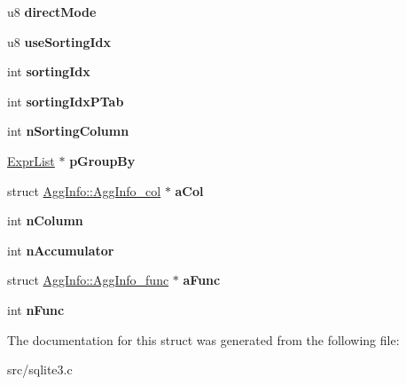 \begin{DoxyCompactItemize}
\item 
\hypertarget{struct_agg_info_aaa57d294016ac7e17e7cacaa7b25634e}{u8 {\bfseries direct\-Mode}}\label{struct_agg_info_aaa57d294016ac7e17e7cacaa7b25634e}

\item 
\hypertarget{struct_agg_info_a8173a7ea13c4a12ce4befbcb40719073}{u8 {\bfseries use\-Sorting\-Idx}}\label{struct_agg_info_a8173a7ea13c4a12ce4befbcb40719073}

\item 
\hypertarget{struct_agg_info_a97ce74f509ca908a616c123e7196797b}{int {\bfseries sorting\-Idx}}\label{struct_agg_info_a97ce74f509ca908a616c123e7196797b}

\item 
\hypertarget{struct_agg_info_a7faac4c3996598960fc46f0c173b244c}{int {\bfseries sorting\-Idx\-P\-Tab}}\label{struct_agg_info_a7faac4c3996598960fc46f0c173b244c}

\item 
\hypertarget{struct_agg_info_a89925dccd1a0ec51d2a5a5dbaead66dc}{int {\bfseries n\-Sorting\-Column}}\label{struct_agg_info_a89925dccd1a0ec51d2a5a5dbaead66dc}

\item 
\hypertarget{struct_agg_info_aa8e942103d224c4db847743670907781}{\hyperlink{struct_expr_list}{Expr\-List} $\ast$ {\bfseries p\-Group\-By}}\label{struct_agg_info_aa8e942103d224c4db847743670907781}

\item 
\hypertarget{struct_agg_info_a52fa1a7eb3145c27be13b2bcccd57d62}{struct \hyperlink{struct_agg_info_1_1_agg_info__col}{Agg\-Info\-::\-Agg\-Info\-\_\-col} $\ast$ {\bfseries a\-Col}}\label{struct_agg_info_a52fa1a7eb3145c27be13b2bcccd57d62}

\item 
\hypertarget{struct_agg_info_a9cbfa5fc33328cf3500426674e036a8b}{int {\bfseries n\-Column}}\label{struct_agg_info_a9cbfa5fc33328cf3500426674e036a8b}

\item 
\hypertarget{struct_agg_info_ad2251760d95af9024f0a3170405cb53b}{int {\bfseries n\-Accumulator}}\label{struct_agg_info_ad2251760d95af9024f0a3170405cb53b}

\item 
\hypertarget{struct_agg_info_a4e201acd6a1f8aed360c58e45f47c803}{struct \hyperlink{struct_agg_info_1_1_agg_info__func}{Agg\-Info\-::\-Agg\-Info\-\_\-func} $\ast$ {\bfseries a\-Func}}\label{struct_agg_info_a4e201acd6a1f8aed360c58e45f47c803}

\item 
\hypertarget{struct_agg_info_a5bfde7ca00d28da6edbda523ab038e38}{int {\bfseries n\-Func}}\label{struct_agg_info_a5bfde7ca00d28da6edbda523ab038e38}

\end{DoxyCompactItemize}


The documentation for this struct was generated from the following file\-:\begin{DoxyCompactItemize}
\item 
src/sqlite3.\-c\end{DoxyCompactItemize}
